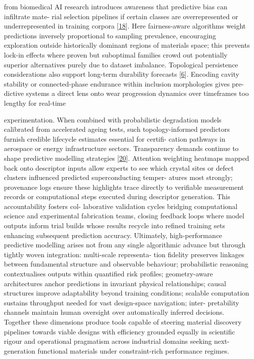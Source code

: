 \documentclass[
]{article}
\begin{document}
from biomedical AI research introduces awareness that predictive bias
can infiltrate mate- rial selection pipelines if certain classes are
overrepresented or underrepresented in training corpora
{[}\hyperref[_bookmark58]{18}{]}. Here fairness-aware algorithms weight
predictions inversely proportional to sampling prevalence, encouraging
exploration outside historically dominant regions of materials space;
this prevents lock-in effects where proven but suboptimal families crowd
out potentially superior alternatives purely due to dataset imbalance.
Topological persistence considerations also support long-term durability
forecasts {[}\hyperref[_bookmark46]{6}{]}. Encoding cavity stability or
connected-phase endurance within inclusion morphologies gives pre-
dictive systems a direct lens onto wear progression dynamics over
timeframes too lengthy for real-time

experimentation. When combined with probabilistic degradation models
calibrated from accelerated ageing tests, such topology-informed
predictors furnish credible lifecycle estimates essential for certifi-
cation pathways in aerospace or energy infrastructure sectors.
Transparency demands continue to shape predictive modelling strategies
{[}\hyperref[_bookmark60]{20}{]}. Attention weighting heatmaps mapped
back onto descriptor inputs allow experts to see which crystal sites or
defect clusters influenced predicted superconducting temper- atures most
strongly; provenance logs ensure these highlights trace directly to
verifiable measurement records or computational steps executed during
descriptor generation. This accountability fosters col- laborative
validation cycles bridging computational science and experimental
fabrication teams, closing feedback loops where model outputs inform
trial builds whose results recycle into refined training sets enhancing
subsequent prediction accuracy. Ultimately, high-performance predictive
modelling arises not from any single algorithmic advance but through
tightly woven integration: multi-scale representa- tion fidelity
preserves linkages between fundamental structure and observable
behaviour; probabilistic reasoning contextualises outputs within
quantified risk profiles; geometry-aware architectures anchor
predictions in invariant physical relationships; causal structures
improve adaptability beyond training conditions; scalable computation
sustains throughput needed for vast design-space navigation; inter-
pretability channels maintain human oversight over automatically
inferred decisions. Together these dimensions produce tools capable of
steering material discovery pipelines towards viable designs with
efficiency grounded equally in scientific rigour and operational
pragmatism across industrial domains seeking next-generation functional
materials under constraint-rich performance regimes.
\end{document}
